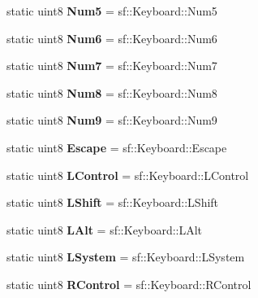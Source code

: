 \begin{DoxyCompactItemize}
static uint8 {\bfseries Num5} = sf\+::\+Keyboard\+::\+Num5
\item 
\mbox{\label{structrvl_1_1_keyboard_ad04b4ec4375bd12405adeab2734e8aa6}} 
static uint8 {\bfseries Num6} = sf\+::\+Keyboard\+::\+Num6
\item 
\mbox{\label{structrvl_1_1_keyboard_a8cd156666967e5c3a8920b0993fb3e70}} 
static uint8 {\bfseries Num7} = sf\+::\+Keyboard\+::\+Num7
\item 
\mbox{\label{structrvl_1_1_keyboard_a0b4da63b840da5fc934f4edda8b21175}} 
static uint8 {\bfseries Num8} = sf\+::\+Keyboard\+::\+Num8
\item 
\mbox{\label{structrvl_1_1_keyboard_a907c0053974e62c79bbfd0a496754f6d}} 
static uint8 {\bfseries Num9} = sf\+::\+Keyboard\+::\+Num9
\item 
\mbox{\label{structrvl_1_1_keyboard_ac22d83195e0f53c1761eae32b8533845}} 
static uint8 {\bfseries Escape} = sf\+::\+Keyboard\+::\+Escape
\item 
\mbox{\label{structrvl_1_1_keyboard_a6d4ec0c6dc56b28be011727e8cc8ff89}} 
static uint8 {\bfseries L\+Control} = sf\+::\+Keyboard\+::\+L\+Control
\item 
\mbox{\label{structrvl_1_1_keyboard_a2fd343d2fa02ed38badbadcf32602432}} 
static uint8 {\bfseries L\+Shift} = sf\+::\+Keyboard\+::\+L\+Shift
\item 
\mbox{\label{structrvl_1_1_keyboard_ad743496f0a4c63e060f12fe83052dd3e}} 
static uint8 {\bfseries L\+Alt} = sf\+::\+Keyboard\+::\+L\+Alt
\item 
\mbox{\label{structrvl_1_1_keyboard_a89894f5c8bce2be121f543ec9072482e}} 
static uint8 {\bfseries L\+System} = sf\+::\+Keyboard\+::\+L\+System
\item 
\mbox{\label{structrvl_1_1_keyboard_a52caaa6bf6d10b6ce0e81c31a22f73f7}} 
static uint8 {\bfseries R\+Control} = sf\+::\+Keyboard\+::\+R\+Control
\item 

\end{DoxyCompactItemize}
